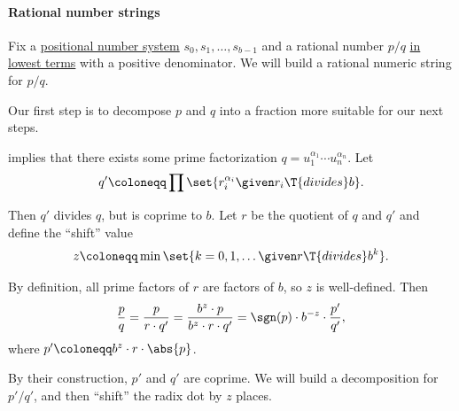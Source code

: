 \paragraph{Rational number strings}

\begin{algorithm}\label{alg:rational_number_to_positional_string}
  Fix a \hyperref[def:positional_number_system]{positional number system} \( s_0, s_1, \ldots, s_{b-1} \) and a rational number \( p / q \) \hyperref[def:lowest_terms]{in lowest terms} with a positive denominator. We will build a rational numeric string for \( p / q \).

  \begin{thmenum}
     Our first step is to decompose \( p \) and \( q \) into a fraction more suitable for our next steps.

     implies that there exists some prime factorization \( q = u_1^{\alpha_1} \cdots u_n^{\alpha_n} \). Let
    \begin{equation}\label{eq:alg:rational_number_to_positional_string/decomposition/q_}
      q' \coloneqq \prod \set{ r_i^{\alpha_i} \given r_i \T{divides} b }.
    \end{equation}

    Then \( q' \) divides \( q \), but is coprime to \( b \). Let \( r \) be the quotient of \( q \) and \( q' \) and define the \enquote{shift} value
    \begin{equation}\label{eq:alg:rational_number_to_positional_string/decomposition/shift}
      z \coloneqq \min\set{ k = 0, 1, \ldots \given r \T{divides} b^k }.
    \end{equation}

    By definition, all prime factors of \( r \) are factors of \( b \), so \( z \) is well-defined. Then
    \begin{equation}\label{eq:alg:rational_number_to_positional_string/decomposition/pq}
      \frac p q
      =
      \frac p {r \cdot q'}
      =
      \frac {b^z \cdot p} {b^z \cdot r \cdot q'}
      =
      \sgn(p) \cdot b^{-z} \cdot \frac {p'} {q'},
    \end{equation}
    where \( p' \coloneqq b^z \cdot r \cdot \abs{p} \).

    By their construction, \( p' \) and \( q' \) are coprime. We will build a decomposition for \( p' / q' \), and then \enquote{shift} the radix dot by \( z \) places.


\end{thmenum}
\end{algorithm}
